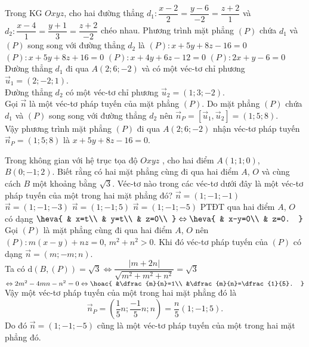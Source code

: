\begin{ex}%
	Trong KG $Oxyz$, cho hai đường thẳng $d_1\colon\dfrac{x-2}{2}=\dfrac{y-6}{-2}=\dfrac{z+2}{1}$ và $d_2\colon\dfrac{x-4}{1}=\dfrac{y+1}{3}=\dfrac{z+2}{-2}$ chéo nhau. Phương trình mặt phẳng $(P)$ chứa $d_1$ và $(P)$ song song với đường thẳng $d_2$ là
	\choice
	{\True $(P)\colon x+5y+8z-16=0$}
	{$(P)\colon x+5y+8z+16=0$}
	{$(P)\colon x+4y+6z-12=0$}
	{$(P)\colon 2x+y-6=0$}
	\loigiai
	{
		Đường thẳng $d_1$ đi qua $ A\left(2;6;-2\right)$ và có một véc-tơ chỉ phương $\overrightarrow{u}_1=\left(2;-2;1\right)$.\\
		Đường thẳng $d_2$ có một véc-tơ chỉ phương $\overrightarrow{u}_2=(1;3;-2)$.\\
		Gọi $\overrightarrow{n}$ là một véc-tơ pháp tuyến của mặt phẳng $(P)$. Do mặt phẳng $(P)$ chứa $d_1$ và $(P)$ song song với đường thẳng $d_2$ nên $\overrightarrow{n}_P=\left[\overrightarrow{u}_1,\overrightarrow{u}_2\right]=(1;5;8)$.\\
		Vậy phương trình mặt phẳng $(P)$ đi qua $ A(2;6;-2)$ nhận véc-tơ pháp tuyến $\overrightarrow{n}_P=(1;5;8)$ là $ x+5y+8z-16=0$.}
\end{ex}

\begin{ex}%
	Trong không gian với hệ trục tọa độ $Oxyz$ , cho hai điểm $ A(1;1;0)$, $ B(0;-1;2)$. Biết rằng có hai mặt phẳng cùng đi qua hai điểm $ A$, $ O$ và cùng cách $ B$ một khoảng bằng $\sqrt{3}$. Véc-tơ nào trong các véc-tơ dưới đây là một véc-tơ pháp tuyến của một trong hai mặt phẳng đó?
	\choice
	{$\overrightarrow{n}=(1;-1;-1)$}
	{$\overrightarrow{n}=(1;-1;-3)$}
	{\True $\overrightarrow{n}=(1;-1;5)$}
	{$\overrightarrow{n}=(1;-1;-5)$}
	\loigiai
	{
		PTĐT qua hai điểm $ A$, $ O$ có dạng $\heva{
			& x=t\\ 
			& y=t\\ 
			& z=0\\ 
		}\Leftrightarrow\heva{
			& x-y=0\\ 
			& z=0.
		}$\\
		Gọi $(P)$ là mặt phẳng cùng đi qua hai điểm $ A$, $ O$ nên $(P)\colon  m\left(x-y\right)+nz=0$, $m^2+n^2>0$. Khi đó véc-tơ pháp tuyến của $(P)$ có dạng $\overrightarrow{n}=(m;-m;n)$.\\
		Ta có $ \mathrm{d}\left(B,(P)\right)=\sqrt{3}\Leftrightarrow\dfrac{\left| m+2n\right|}{\sqrt{m^2+m^2+n^2}}=\sqrt{3}$ $\Leftrightarrow 2m^2-4mn-n^2=0\Leftrightarrow\hoac{
			&\dfrac{m}{n}=1\\ 
			&\dfrac{m}{n}=\dfrac{1}{5}.
		}$\\
		Vậy một véc-tơ pháp tuyến của một trong hai mặt phẳng đó là $$\overrightarrow{n}_P=\left(\dfrac{1}{5}n; \dfrac{-1}{5}n; n\right)=\dfrac{n}{5}\left(1; -1; 5\right).$$
		Do đó $\overrightarrow{n}=(1;-1;-5)$ cũng là một véc-tơ pháp tuyến của một trong hai mặt phẳng đó.}
\end{ex}

